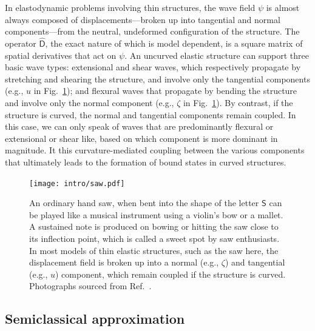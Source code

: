 In elastodynamic problems involving thin structures, the wave field $\psi$ is almost always composed of displacements---broken up into tangential and normal components---from the neutral, undeformed configuration of the structure.
The operator $\widehat{\mathsf{D}}$, the exact nature of which is model dependent, is a square matrix of spatial derivatives that act on $\psi$.
An uncurved elastic structure can support three basic wave types: extensional and shear waves, which respectively propagate by stretching and shearing the structure, and involve only the tangential components (e.g., $u$ in Fig.~\ref{fig:saw}); and flexural waves that propagate by bending the structure and involve only the normal component (e.g., $\zeta$ in Fig.~\ref{fig:saw}).
By contrast, if the structure is curved, the normal and tangential components remain coupled.
In this case, we can only speak of waves that are predominantly flexural or extensional or shear like, based on which component is more dominant in magnitude.
It this curvature-mediated coupling between the various components that ultimately leads to the formation of bound states in curved structures.
%
\begin{figure}
  \begin{center}
    \texttt{[image: intro/saw.pdf]}
  \end{center}
  \caption{%
    An ordinary hand saw, when bent into the shape of the letter $\mathsf{S}$ can be played like a musical instrument using a violin's bow or a mallet.
    A sustained note is produced on bowing or hitting the saw close to its inflection point, which is called a sweet spot by saw enthusiasts.
    In most models of thin elastic structures, such as the saw here, the displacement field is broken up into a normal (e.g., $\zeta$) and tangential (e.g., $u$) component, which remain coupled if the structure is curved.
    Photographs sourced from Ref.~\cite{shankar2022}.
  }
  \label{fig:saw}
\end{figure}

\subsection{Semiclassical approximation}

